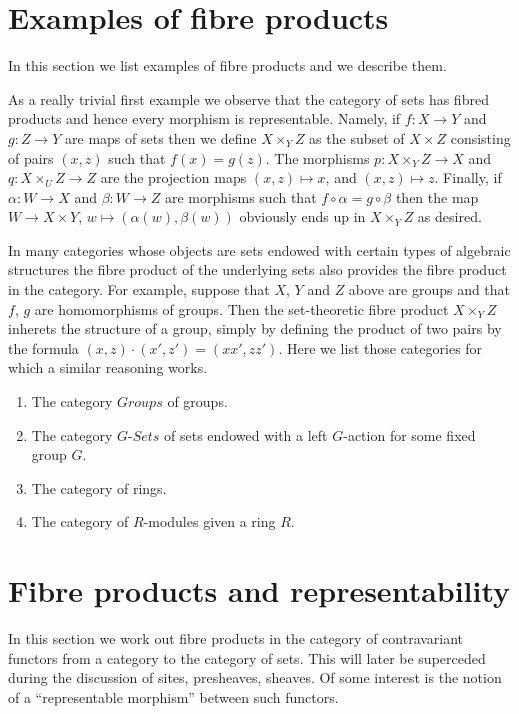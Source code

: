 \section{Examples of fibre products}
\label{section-example-fibre-products}

\noindent
In this section we list examples of fibre products and
we describe them.

\medskip\noindent
As a really trivial first example we observe
that the category of sets has fibred products and hence every
morphism is representable. Namely, if $f : X \to Y$
and $g : Z \to Y$ are maps of sets then we define
$X\times_Y Z$ as the subset of $X\times Z$ consisting
of pairs $(x, z)$ such that $f(x) = g(z)$. The morphisms
$p : X\times_Y Z \to X$ and $q : X\times_U Z \to Z$ are
the projection maps $(x, z) \mapsto x$, and $(x, z) \mapsto z$.
Finally, if $\alpha : W \to X$ and $\beta : W \to Z$
are morphisms such that $f \circ \alpha = g \circ \beta$
then the map $W \to X\times Y$, $w\mapsto (\alpha(w), \beta(w))$
obviously ends up in $X\times_YZ$ as desired.

\medskip\noindent
In many categories whose objects are sets endowed with certain types of
algebraic structures the fibre product of the underlying sets also
provides the fibre product in the category. For example, suppose
that $X$, $Y$ and $Z$ above are groups and that $f$, $g$ are
homomorphisms of groups. Then the set-theoretic fibre product
$X\times_Y Z$ inherets the structure of a group, simply by
defining the product of two pairs by the formula
$(x, z) \cdot (x', z') = (xx', zz')$. Here we list those categories
for which a similar reasoning works.
\begin{enumerate}
\item The category $\textit{Groups}$ of groups.
\item The category $G\textit{-Sets}$ of sets
endowed with a left $G$-action for some fixed group $G$.
\item The category of rings.
\item The category of $R$-modules given a ring $R$.
\end{enumerate}




\section{Fibre products and representability}
\label{section-representable-map-presheaves}

\noindent
In this section we work out fibre products in the
category of contravariant functors from a category
to the category of sets. This will later be superceded
during the discussion of sites, presheaves, sheaves. Of some
interest is the notion of a ``representable morphism'' between
such functors.

